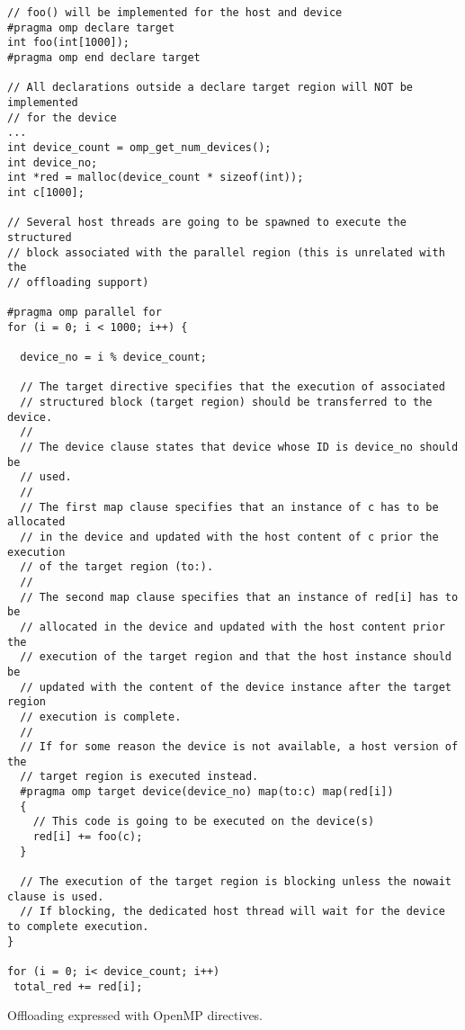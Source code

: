 \begin{example}
\lstset{basicstyle=\scriptsize,frame=single}
\begin{lstlisting}
// foo() will be implemented for the host and device
#pragma omp declare target
int foo(int[1000]);
#pragma omp end declare target

// All declarations outside a declare target region will NOT be implemented
// for the device 
...
int device_count = omp_get_num_devices();
int device_no;
int *red = malloc(device_count * sizeof(int));
int c[1000];

// Several host threads are going to be spawned to execute the structured 
// block associated with the parallel region (this is unrelated with the
// offloading support)

#pragma omp parallel for
for (i = 0; i < 1000; i++) {

  device_no = i % device_count;

  // The target directive specifies that the execution of associated 
  // structured block (target region) should be transferred to the device. 
  //
  // The device clause states that device whose ID is device_no should be 
  // used.
  // 
  // The first map clause specifies that an instance of c has to be allocated 
  // in the device and updated with the host content of c prior the execution 
  // of the target region (to:).
  //
  // The second map clause specifies that an instance of red[i] has to be 
  // allocated in the device and updated with the host content prior the 
  // execution of the target region and that the host instance should be 
  // updated with the content of the device instance after the target region 
  // execution is complete.
  //
  // If for some reason the device is not available, a host version of the 
  // target region is executed instead.
  #pragma omp target device(device_no) map(to:c) map(red[i])
  { 
    // This code is going to be executed on the device(s)
    red[i] += foo(c); 
  }

  // The execution of the target region is blocking unless the nowait clause is used.
  // If blocking, the dedicated host thread will wait for the device to complete execution.
}

for (i = 0; i< device_count; i++)
 total_red += red[i];
\end{lstlisting}
\lstset{basicstyle=\small\bfseries,frame=none}
\caption{Offloading expressed with OpenMP directives.}
\label{ex:OffloadingExample}
\end{example}